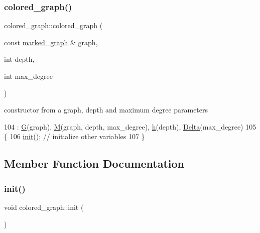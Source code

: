 \subsubsection{\texorpdfstring{colored\+\_\+graph()}{colored\_graph()}}
{\footnotesize\ttfamily colored\+\_\+graph\+::colored\+\_\+graph (\begin{DoxyParamCaption}\item[{const \hyperlink{classmarked__graph}{marked\+\_\+graph} \&}]{graph,  }\item[{int}]{depth,  }\item[{int}]{max\+\_\+degree }\end{DoxyParamCaption})\hspace{0.3cm}{\ttfamily [inline]}}



constructor from a graph, depth and maximum degree parameters 


\begin{DoxyCode}
104                                                                     : \hyperlink{classcolored__graph_a39186b56cad58c368d6947656976e18d}{G}(graph), 
      \hyperlink{classcolored__graph_ab72c568fe12f7c849ca6bffb145aec47}{M}(graph, depth, max\_degree), \hyperlink{classcolored__graph_ae27062a4ee59df2670d3a0c81e85a3fa}{h}(depth), \hyperlink{classcolored__graph_a5b0e93eb40a20dc815c809dee11edc12}{Delta}(max\_degree)
105   \{
106     \hyperlink{classcolored__graph_a463f9f010d6124df8d03b4f7649a130d}{init}(); \textcolor{comment}{// initialize other variables }
107   \}
\end{DoxyCode}


\subsection{Member Function Documentation}
\mbox{\label{classcolored__graph_a463f9f010d6124df8d03b4f7649a130d}} 
\subsubsection{\texorpdfstring{init()}{init()}}
{\footnotesize\ttfamily void colored\+\_\+graph\+::init (\begin{DoxyParamCaption}{ }\end{DoxyParamCaption})}



